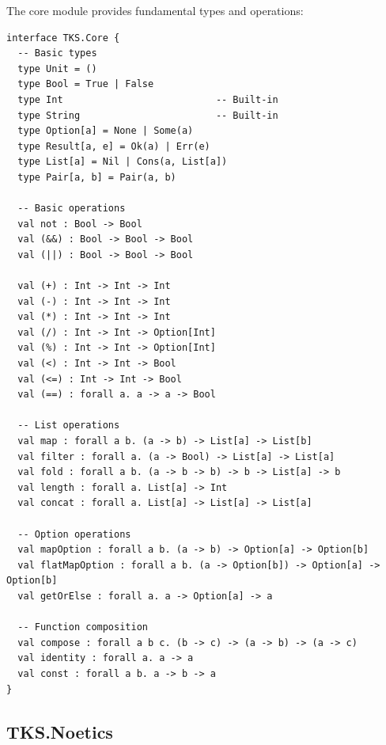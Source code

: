 \begin{definition}
\label{def:tks-core}
The core module provides fundamental types and operations:
\begin{verbatim}
interface TKS.Core {
  -- Basic types
  type Unit = ()
  type Bool = True | False
  type Int                           -- Built-in
  type String                        -- Built-in
  type Option[a] = None | Some(a)
  type Result[a, e] = Ok(a) | Err(e)
  type List[a] = Nil | Cons(a, List[a])
  type Pair[a, b] = Pair(a, b)

  -- Basic operations
  val not : Bool -> Bool
  val (&&) : Bool -> Bool -> Bool
  val (||) : Bool -> Bool -> Bool

  val (+) : Int -> Int -> Int
  val (-) : Int -> Int -> Int
  val (*) : Int -> Int -> Int
  val (/) : Int -> Int -> Option[Int]
  val (%) : Int -> Int -> Option[Int]
  val (<) : Int -> Int -> Bool
  val (<=) : Int -> Int -> Bool
  val (==) : forall a. a -> a -> Bool

  -- List operations
  val map : forall a b. (a -> b) -> List[a] -> List[b]
  val filter : forall a. (a -> Bool) -> List[a] -> List[a]
  val fold : forall a b. (a -> b -> b) -> b -> List[a] -> b
  val length : forall a. List[a] -> Int
  val concat : forall a. List[a] -> List[a] -> List[a]

  -- Option operations
  val mapOption : forall a b. (a -> b) -> Option[a] -> Option[b]
  val flatMapOption : forall a b. (a -> Option[b]) -> Option[a] -> Option[b]
  val getOrElse : forall a. a -> Option[a] -> a

  -- Function composition
  val compose : forall a b c. (b -> c) -> (a -> b) -> (a -> c)
  val identity : forall a. a -> a
  val const : forall a b. a -> b -> a
}
\end{verbatim}
\end{definition}

\subsection{TKS.Noetics}
\label{subsec:tks-noetics}

